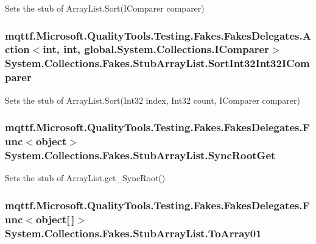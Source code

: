 Sets the stub of Array\-List.\-Sort(\-I\-Comparer comparer)

\hypertarget{class_system_1_1_collections_1_1_fakes_1_1_stub_array_list_a7ea171340540ebd8cad498c599f16ec9}{
\subsubsection[{Sort\-Int32\-Int32\-I\-Comparer}]{\setlength{\rightskip}{0pt plus 5cm}mqttf.\-Microsoft.\-Quality\-Tools.\-Testing.\-Fakes.\-Fakes\-Delegates.\-Action$<$int, int, global.\-System.\-Collections.\-I\-Comparer$>$ System.\-Collections.\-Fakes.\-Stub\-Array\-List.\-Sort\-Int32\-Int32\-I\-Comparer}}\label{class_system_1_1_collections_1_1_fakes_1_1_stub_array_list_a7ea171340540ebd8cad498c599f16ec9}


Sets the stub of Array\-List.\-Sort(\-Int32 index, Int32 count, I\-Comparer comparer)

\hypertarget{class_system_1_1_collections_1_1_fakes_1_1_stub_array_list_a69b8739f0bdd80985a9b6eabd9c773ba}{
\subsubsection[{Sync\-Root\-Get}]{\setlength{\rightskip}{0pt plus 5cm}mqttf.\-Microsoft.\-Quality\-Tools.\-Testing.\-Fakes.\-Fakes\-Delegates.\-Func$<$object$>$ System.\-Collections.\-Fakes.\-Stub\-Array\-List.\-Sync\-Root\-Get}}\label{class_system_1_1_collections_1_1_fakes_1_1_stub_array_list_a69b8739f0bdd80985a9b6eabd9c773ba}


Sets the stub of Array\-List.\-get\-\_\-\-Sync\-Root()

\hypertarget{class_system_1_1_collections_1_1_fakes_1_1_stub_array_list_afae1b7eb7e1ab266ab7770a577ae4efa}{
\subsubsection[{To\-Array01}]{\setlength{\rightskip}{0pt plus 5cm}mqttf.\-Microsoft.\-Quality\-Tools.\-Testing.\-Fakes.\-Fakes\-Delegates.\-Func$<$object\mbox{[}$\,$\mbox{]}$>$ System.\-Collections.\-Fakes.\-Stub\-Array\-List.\-To\-Array01}}\label{class_system_1_1_collections_1_1_fakes_1_1_stub_array_list_afae1b7eb7e1ab266ab7770a577ae4efa}


